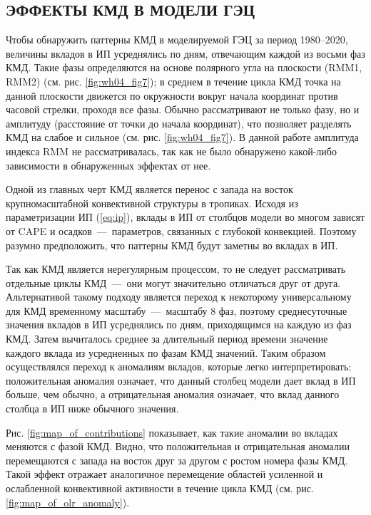 \subsection{ЭФФЕКТЫ КМД В МОДЕЛИ ГЭЦ}
\label{sec:eff_mjo_gec}

Чтобы обнаружить паттерны КМД в моделируемой ГЭЦ за период 1980--2020, величины вкладов в ИП усреднялись по дням, отвечающим каждой из восьми фаз КМД. Такие фазы определяются на основе полярного угла на плоскости (RMM1, RMM2) (см. рис. \ref{fig:wh04_fig7}); в среднем в течение цикла КМД точка на данной плоскости движется по окружности вокруг начала координат против часовой стрелки, проходя все фазы. Обычно рассматривают не только фазу, но и амплитуду (расстояние от точки до начала координат), что позволяет разделять КМД на слабое и сильное (см. рис. \ref{fig:wh04_fig7}). В данной работе амплитуда индекса RMM не рассматривалась, так как не было обнаружено какой-либо зависимости в обнаруженных эффектах от нее.

Одной из главных черт КМД является перенос с запада на восток крупномасштабной конвективной структуры в тропиках. Исходя из параметризации ИП (\ref{eq:ip}), вклады в ИП от столбцов модели во многом зависят от CAPE и осадков~---~параметров, связанных с глубокой конвекцией. Поэтому разумно предположить, что паттерны КМД будут заметны во вкладах в ИП.

Так как КМД является нерегулярным процессом, то не следует рассматривать отдельные циклы КМД~---~они могут значительно отличаться друг от друга. Альтернативой такому подходу является переход к некоторому универсальному для КМД временному масштабу~---~масштабу 8 фаз, поэтому среднесуточные значения вкладов в ИП усреднялись по дням, приходящимся на каждую из фаз КМД. Затем вычиталось среднее за длительный период времени значение каждого вклада из усредненных по фазам КМД значений. Таким образом осуществлялся переход к аномалиям вкладов, которые легко интерпретировать: положительная аномалия означает, что данный столбец модели дает вклад в ИП больше, чем обычно, а отрицательная аномалия означает, что вклад данного столбца в ИП ниже обычного значения.

Рис. \ref{fig:map_of_contributions} показывает, как такие аномалии во вкладах меняются с фазой КМД. Видно, что положительная и отрицательная аномалии перемещаются с запада на восток друг за другом с ростом номера фазы КМД. Такой эффект отражает аналогичное перемещение областей усиленной и ослабленной конвективной активности в течение цикла КМД (см. рис. \ref{fig:map_of_olr_anomaly}).

